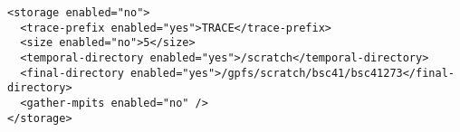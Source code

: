 \begin{verbatim}
<storage enabled="no">
  <trace-prefix enabled="yes">TRACE</trace-prefix>
  <size enabled="no">5</size>
  <temporal-directory enabled="yes">/scratch</temporal-directory>
  <final-directory enabled="yes">/gpfs/scratch/bsc41/bsc41273</final-directory>
  <gather-mpits enabled="no" />
</storage>
\end{verbatim}
